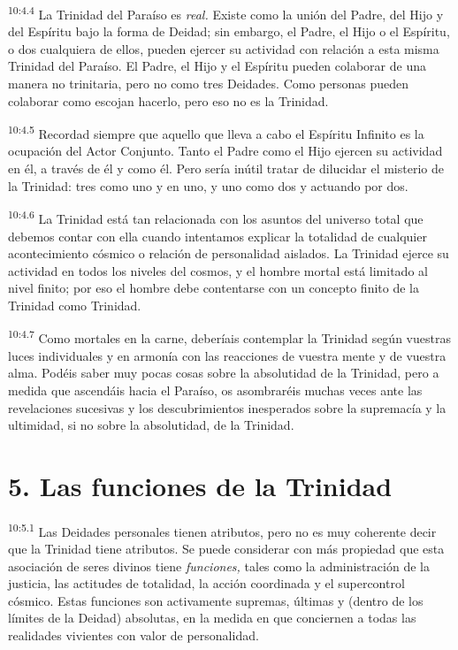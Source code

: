 \par
\textsuperscript{10:4.4} La Trinidad del Paraíso es \textit{real.} Existe como la unión del Padre, del Hijo y del Espíritu bajo la forma de Deidad; sin embargo, el Padre, el Hijo o el Espíritu, o dos cualquiera de ellos, pueden ejercer su actividad con relación a esta misma Trinidad del Paraíso. El Padre, el Hijo y el Espíritu pueden colaborar de una manera no trinitaria, pero no como tres Deidades. Como personas pueden colaborar como escojan hacerlo, pero eso no es la Trinidad.

\par
\textsuperscript{10:4.5} Recordad siempre que aquello que lleva a cabo el Espíritu Infinito es la ocupación del Actor Conjunto. Tanto el Padre como el Hijo ejercen su actividad en él, a través de él y como él. Pero sería inútil tratar de dilucidar el misterio de la Trinidad: tres como uno y en uno, y uno como dos y actuando por dos.

\par
\textsuperscript{10:4.6} La Trinidad está tan relacionada con los asuntos del universo total que debemos contar con ella cuando intentamos explicar la totalidad de cualquier acontecimiento cósmico o relación de personalidad aislados. La Trinidad ejerce su actividad en todos los niveles del cosmos, y el hombre mortal está limitado al nivel finito; por eso el hombre debe contentarse con un concepto finito de la Trinidad como Trinidad.

\par
\textsuperscript{10:4.7} Como mortales en la carne, deberíais contemplar la Trinidad según vuestras luces individuales y en armonía con las reacciones de vuestra mente y de vuestra alma. Podéis saber muy pocas cosas sobre la absolutidad de la Trinidad, pero a medida que ascendáis hacia el Paraíso, os asombraréis muchas veces ante las revelaciones sucesivas y los descubrimientos inesperados sobre la supremacía y la ultimidad, si no sobre la absolutidad, de la Trinidad.

\section*{5. Las funciones de la Trinidad}
\par
\textsuperscript{10:5.1} Las Deidades personales tienen atributos, pero no es muy coherente decir que la Trinidad tiene atributos. Se puede considerar con más propiedad que esta asociación de seres divinos tiene \textit{funciones,} tales como la administración de la justicia, las actitudes de totalidad, la acción coordinada y el supercontrol cósmico. Estas funciones son activamente supremas, últimas y (dentro de los límites de la Deidad) absolutas, en la medida en que conciernen a todas las realidades vivientes con valor de personalidad.

